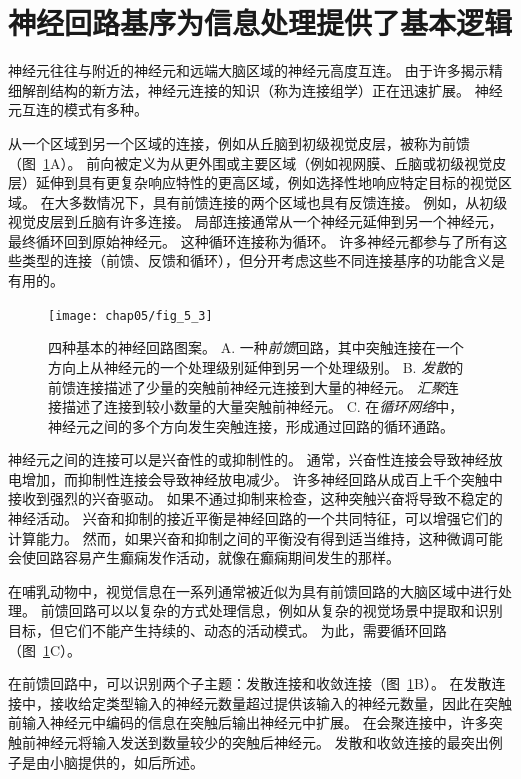 \section{神经回路基序为信息处理提供了基本逻辑}

神经元往往与附近的神经元和远端大脑区域的神经元高度互连。
由于许多揭示精细解剖结构的新方法，神经元连接的知识（称为连接组学）正在迅速扩展。
神经元互连的模式有多种。


从一个区域到另一个区域的连接，例如从丘脑到初级视觉皮层，被称为前馈（图~\ref{fig:5_3}A）。 
前向被定义为从更外围或主要区域（例如视网膜、丘脑或初级视觉皮层）延伸到具有更复杂响应特性的更高区域，例如选择性地响应特定目标的视觉区域。
在大多数情况下，具有前馈连接的两个区域也具有反馈连接。
例如，从初级视觉皮层到丘脑有许多连接。
局部连接通常从一个神经元延伸到另一个神经元，最终循环回到原始神经元。
这种循环连接称为循环。
许多神经元都参与了所有这些类型的连接（前馈、反馈和循环），但分开考虑这些不同连接基序的功能含义是有用的。


\begin{figure}[htbp]
	\centering
	\texttt{[image: chap05/fig\_5\_3]}
	\caption{四种基本的神经回路图案。 
		A. 一种\textit{前馈}回路，其中突触连接在一个方向上从神经元的一个处理级别延伸到另一个处理级别。
		B. \textit{发散}的前馈连接描述了少量的突触前神经元连接到大量的神经元。
		\textit{汇聚}连接描述了连接到较小数量的大量突触前神经元。
		C. 在\textit{循环网络}中，神经元之间的多个方向发生突触连接，形成通过回路的循环通路。}
	\label{fig:5_3}
\end{figure}


神经元之间的连接可以是兴奋性的或抑制性的。
通常，兴奋性连接会导致神经放电增加，而抑制性连接会导致神经放电减少。
许多神经回路从成百上千个突触中接收到强烈的兴奋驱动。
如果不通过抑制来检查，这种突触兴奋将导致不稳定的神经活动。
兴奋和抑制的接近平衡是神经回路的一个共同特征，可以增强它们的计算能力。
然而，如果兴奋和抑制之间的平衡没有得到适当维持，这种微调可能会使回路容易产生癫痫发作活动，就像在癫痫期间发生的那样。


在哺乳动物中，视觉信息在一系列通常被近似为具有前馈回路的大脑区域中进行处理。
前馈回路可以以复杂的方式处理信息，例如从复杂的视觉场景中提取和识别目标，但它们不能产生持续的、动态的活动模式。
为此，需要循环回路（图~\ref{fig:5_3}C）。


在前馈回路中，可以识别两个子主题：发散连接和收敛连接（图~\ref{fig:5_3}B）。 
在发散连接中，接收给定类型输入的神经元数量超过提供该输入的神经元数量，因此在突触前输入神经元中编码的信息在突触后输出神经元中扩展。
在会聚连接中，许多突触前神经元将输入发送到数量较少的突触后神经元。
发散和收敛连接的最突出例子是由小脑提供的，如后所述。



